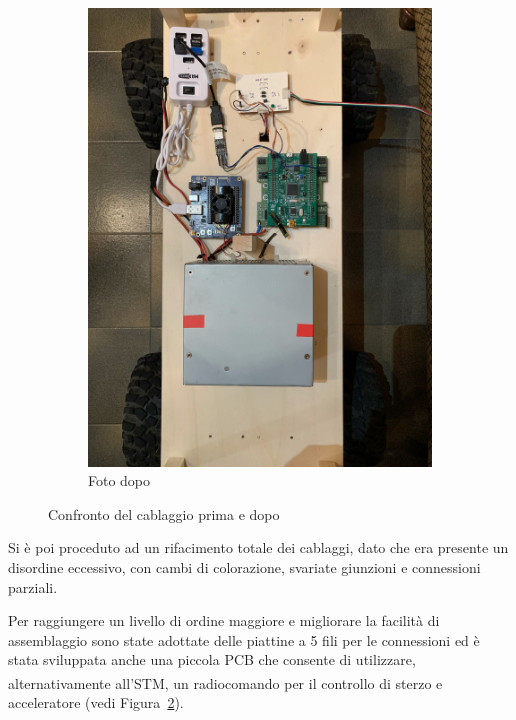\begin{figure}[h]
\begin{subfigure}[b]{0.35\textwidth}
    \includegraphics[width=\textwidth]{Capitolo1/Figs/foto_dopo.png}
    \caption{Foto dopo}
    \label{fig:foto_dopo}
  \end{subfigure}            
  \caption[Confronto prima e dopo cablaggio]{Confronto del cablaggio prima e dopo}
  \label{fig:confronto_cablaggio}
\end{figure}

Si è poi proceduto ad un rifacimento totale dei cablaggi, dato che era presente un disordine eccessivo, con cambi di colorazione, svariate giunzioni e connessioni parziali.

Per raggiungere un livello di ordine maggiore e migliorare la facilità di assemblaggio sono state adottate delle piattine a 5 fili per le connessioni ed è stata sviluppata anche una piccola PCB che consente di utilizzare, alternativamente all’STM\textsuperscript\textregistered, un radiocomando per il controllo di sterzo e acceleratore (vedi Figura~\ref{fig:confronto_cablaggio}).

